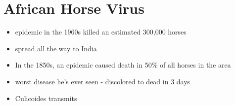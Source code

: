 \documentclass{article}
\begin{document}
    \section{African Horse Virus}
    \begin{itemize}
        \item epidemic in the 1960s killed an estimated 300,000 horses
        \item spread all the way to India
        \item In the 1850s, an epidemic caused death in 50\% of all horses in the area
        \item worst disease he's ever seen - discolored to dead in 3 days
        \item Culicoides transmits
    \end{itemize}
\end{document}
